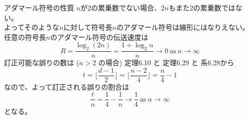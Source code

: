 \documentclass[dvipdfmx,10pt,jsarticle]{beamer}
\begin{document}
  \begin{frame}{アダマール符号の性質}
    $n$が$2$の累乗数でない場合、$2n$もまた$2$の累乗数ではない。 \\
    よってそのような$n$に対して符号長$n$のアダマール符号は線形にはなりえない。\\
    任意の符号長$n$のアダマール符号の伝送速度は
    \[ R = \frac{\log_2 (2n)}{n} = \frac{1 + \log_2 n}{n} \rightarrow 0 \ \text{as} \ n \rightarrow \infty \]
    訂正可能な誤りの数は ($n > 2$ の場合) 定理6.10 と 定理6.29 と 系6.28から
    \[t = \lfloor \frac{d-1}{2} \rfloor = \lfloor \frac{n -2}{4} \rfloor = \frac n4 - 1 \]
    なので、よって訂正される誤りの割合は
    \[ \frac tn = \frac 14 - \frac 1n \rightarrow \frac 14 \ \text{as} \ n \rightarrow \infty \]
    となる。
  \end{frame}
\end{document}
